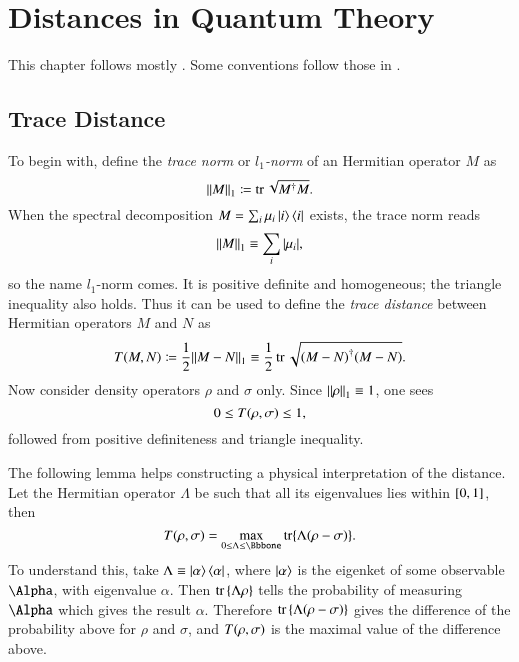 \chapter{Distances in Quantum Theory}
\label{chap:distappd}

This chapter follows mostly \cite{Wilde2009}. Some conventions follow those in 
\cite{Petz2008}.

\section{Trace Distance}
\label{sec:trace-dist}

To begin with, define the \emph{trace norm} or \emph{$l_1$-norm} of an 
Hermitian operator $M$ as
\begin{equation}
	{\left\|M\right\|}_1 \coloneqq \operatorname{tr}\sqrt{M^\dagger M}.
\end{equation}
When the spectral decomposition $M = \sum_i \mu_i \Ket{i}\Bra{i}$ exists, the 
trace norm reads
\begin{equation}
	{\left\|M\right\|}_1 \equiv \sum_i{\left|\mu_i\right|},
\end{equation}
so the name $l_1$-norm comes. It is positive definite and homogeneous; the 
triangle inequality also holds. Thus it can be used to define the \emph{trace 
distance} between Hermitian operators ${M}$ and ${N}$ as
\begin{equation}
{T}\mathopen{}\left({M}, {N}\right)\mathclose{} \coloneqq \frac{1}{2} {\left\|M-N\right\|}_1 \equiv
\frac{1}{2} \operatorname{tr} \sqrt{{\left({M}-{N}\right)}^\dagger{\left({M}-{N}\right)}}.
\label{eq:def-trace-dist}
\end{equation}
Now consider density operators $\rho$ and $\sigma$ only. Since ${\left\|\rho\right\|}_1 
\equiv 1$, one sees
\begin{equation}
0 \le {T}\mathopen{}\left({\rho}, {\sigma}\right)\mathclose{} \le 1,
\label{eq:def-trace-prop}
\end{equation}
followed from positive definiteness and triangle inequality.

The following lemma helps constructing a physical interpretation of the 
distance. Let the Hermitian operator $\Lambda$ be such that all its eigenvalues 
lies within ${\left[0,1\right]}$, then
\begin{equation}
\rfun{T}{{\rho}, {\sigma}} = \max_{0 \le {\Lambda} \le \Bbbone}
\cfun{\tr}{{\Lambda}\rbr{{\rho}-{\sigma}}}.
\end{equation}
To understand this, take $\Lambda \equiv \Ket{\alpha}\Bra{\alpha}$,
where $\Ket{\alpha}$ is the eigenket of some observable $\Alpha$, with 
eigenvalue $\alpha$. Then $\operatorname{tr}{\left\{\Lambda \rho\right\}}$ tells the probability of 
measuring $\Alpha$ which gives the result $\alpha$. Therefore $\operatorname{tr}{\left\{\Lambda 
{\left(\rho-\sigma\right)}\right\}}$ gives the difference of the probability above for $\rho$ and 
$\sigma$, and ${T}\mathopen{}\left({\rho}, {\sigma}\right)\mathclose{}$ is the maximal value of the 
difference above.

